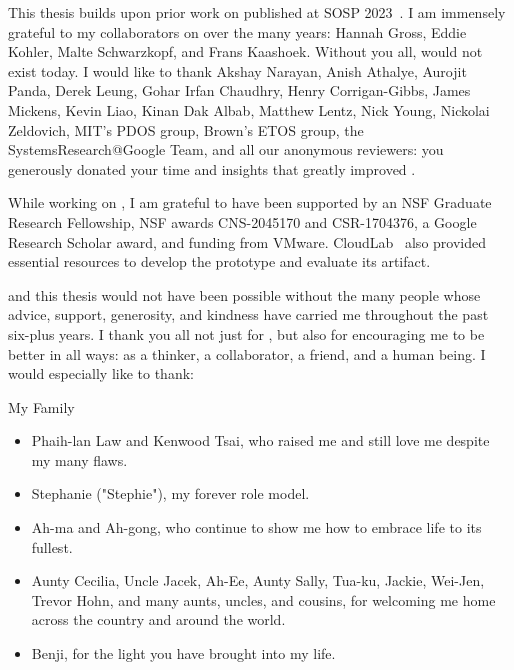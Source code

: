 %
This thesis builds upon prior work on \sys published at SOSP 2023~\cite{edna}.
I am immensely grateful to my collaborators on \sys over the many years: Hannah
Gross, Eddie Kohler, Malte Schwarzkopf, and Frans Kaashoek. Without you all,
\sys would not exist today.
%
I would like to thank Akshay Narayan, Anish Athalye, Aurojit Panda, Derek
Leung, Gohar Irfan Chaudhry, Henry Corrigan-Gibbs, James Mickens, Kevin Liao,
Kinan Dak Albab, Matthew Lentz, Nick Young, Nickolai Zeldovich, MIT's PDOS
group, Brown's ETOS group, the SystemsResearch@Google Team, and all our
anonymous reviewers: you generously donated your time and insights that greatly
improved \sys. 
%

%
While working on \sys, I am grateful to have been supported by an NSF Graduate
Research Fellowship, NSF awards CNS-2045170 and CSR-1704376, a Google Research
Scholar award, and funding from VMware.
%
CloudLab~\cite{cloudlab} also provided essential resources
to develop the \sys prototype and evaluate its artifact.
%

%
\sys and this thesis would not have been possible without the many people whose
advice, support, generosity, and kindness have carried me throughout the past
six-plus years.
%
I thank you all not just for \sys, but also for encouraging me to be better in
all ways: as a thinker, a collaborator, a friend, and a human being.
%
I would especially like to thank:

\begin{center}{My Family}\end{center}
    \begin{itemize}
    \item Phaih-lan Law and Kenwood Tsai, who raised me and still love me despite my many flaws. 
    
    \item Stephanie ("Stephie"), my forever role model. 
     
     \item Ah-ma and Ah-gong, who continue to show me how to embrace life to its fullest. 
        
    \item Aunty Cecilia, Uncle Jacek, Ah-Ee, Aunty Sally, Tua-ku, Jackie,
        Wei-Jen, Trevor Hohn, and many aunts, uncles, and cousins, for welcoming
            me home across the country and around the world.

    \item Benji, for the light you have brought into my life.
    \end{itemize}

